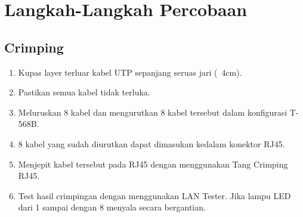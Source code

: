 \section{Langkah-Langkah Percobaan}
\subsection{Crimping}
\begin{enumerate}
    \item Kupas layer terluar kabel UTP sepanjang seruas jari (~4cm).
    \item Pastikan semua kabel tidak terluka.
    \item Meluruskan 8 kabel dan mengurutkan 8 kabel tersebut dalam konfigurasi T-568B.
    \item 8 kabel yang sudah diurutkan dapat dimasukan kedalam konektor RJ45.
    \item Menjepit kabel tersebut pada RJ45 dengan menggunakan Tang Crimping RJ45.
    \item Test hasil crimpingan dengan menggunakan LAN Tester. Jika lampu LED dari 1 sampai dengan 8 menyala secara bergantian.
\end{enumerate}

